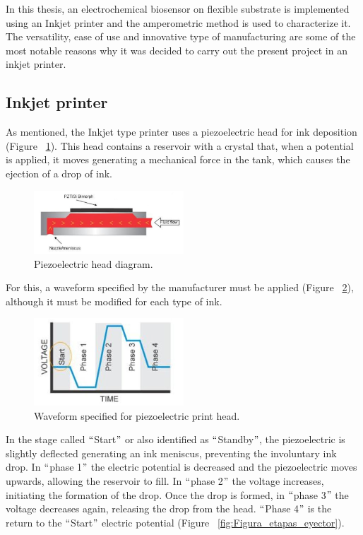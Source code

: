 In this thesis, an electrochemical biosensor on flexible substrate is implemented using an Inkjet printer and the amperometric method is used to characterize it. The versatility, ease of use and innovative type of manufacturing are some of the most notable reasons why it was decided to carry out the present project in an inkjet printer.

\subsection{Inkjet printer}
As mentioned, the Inkjet type printer uses a piezoelectric head for ink deposition  (Figure ~\ref{fig:Figura_Piezoelectrico}). This head contains a reservoir with a crystal that, when a potential is applied, it moves generating a mechanical force in the tank, which causes the ejection of a drop of ink.

\begin{figure}[H]
  \centering
    \includegraphics[width=0.5\textwidth]{Figures/Figura_Piezoelectrico}
  \caption{Piezoelectric head diagram.}
  \label{fig:Figura_Piezoelectrico}
\end{figure}

For this, a waveform specified by the manufacturer must be applied (Figure ~\ref{fig:Figura_Waveform_Dimatix}), although it must be modified for each type of ink.

\begin{figure}[H]
  \centering
    \includegraphics[width=0.5\textwidth]{Figures/Figura_Waveform_Dimatix}
  \caption{Waveform specified for piezoelectric print head.}
  \label{fig:Figura_Waveform_Dimatix}
\end{figure}

In the stage called $``$Start$"$ or also identified as $``$Standby$"$, the piezoelectric is slightly deflected generating an ink meniscus, preventing the involuntary ink drop. In $``$phase 1$"$ the electric potential is decreased and the piezoelectric moves upwards, allowing the reservoir to fill. In $``$phase 2$"$ the voltage increases, initiating the formation of the drop. Once the drop is formed, in $``$phase 3$"$ the voltage decreases again, releasing the drop from the head. $``$Phase 4$"$ is the return to the $``$Start$"$ electric potential (Figure ~\ref{fig:Figura_etapas_eyector}).

